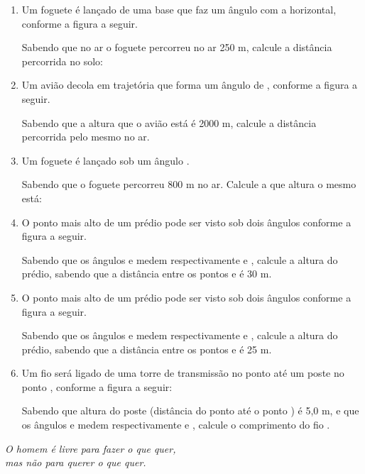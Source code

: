 \documentclass[twocolumn,oneside,a4paper,12pt]{article}
\begin{document}
\begin{enumerate}
\item Um foguete é lançado de uma base que faz um ângulo  com a horizontal, conforme a figura a seguir.


Sabendo que no ar o foguete percorreu no ar 250 m, calcule a distância percorrida no solo:

\item Um avião decola em trajetória que forma um ângulo de , conforme a figura a seguir.


Sabendo que a altura que o avião está é 2000 m, calcule a distância percorrida pelo mesmo no ar.

\item Um foguete é lançado sob um ângulo .


Sabendo que o foguete percorreu 800 m no ar. Calcule a que altura o mesmo está:

\item O ponto mais alto de um prédio pode ser visto sob dois ângulos conforme a figura a seguir.


Sabendo que os ângulos \m{\alpha} e \m{\beta} medem respectivamente  e , calcule a altura do prédio, sabendo que a distância entre os pontos  e  é 30 m.

\item O ponto mais alto de um prédio pode ser visto sob dois ângulos conforme a figura a seguir.


Sabendo que os ângulos \m{\alpha} e \m{\beta} medem respectivamente  e , calcule a altura do prédio, sabendo que a distância entre os pontos  e  é 25 m.

\item Um fio será ligado de uma torre de transmissão no ponto  até um poste no ponto , conforme a figura a seguir:


Sabendo que altura do poste (distância do ponto  até o ponto ) é 5,0 m, e que os ângulos \m{\alpha} e \m{\beta} medem respectivamente  e , calcule o comprimento do fio .

\end{enumerate}

\begin{flushright}
\textit{O homem é livre para fazer o que quer,\\mas não para querer o que quer.}
\end{flushright}
\end{document}
